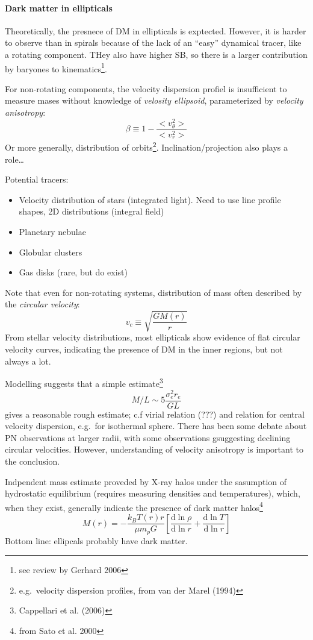 \documentclass{article}
\newcommand{\mynotes}[1]{\textcolor{cadmiumgreen}{#1}}
\begin{document}
\paragraph{Dark matter in ellipticals}
Theoretically, the presnece of DM in ellipticals is exptected. However, it
is harder to observe than in spirals because of the lack of an ``easy''
dynamical tracer, like a rotating component. THey also have higher SB,
so there is a larger contribution by baryones to kinematics\footnote{see
review by Gerhard 2006}.

For non-rotating components, the velocity dispersion profiel is insufficient
to measure mases without knowledge of \textit{velosity ellipsoid},
parameterized by \textit{velocity anisotropy}:
\[
    \beta \equiv 1 - \frac{<v_{\theta}^{2}>}{<v_{r}^{2}>}
    \]
Or more generally, distribution of orbits\footnote{e.g.\ velocity dispersion
profiles, from van der Marel (1994)}. Inclination/projection also plays a
role\ldots

Potential tracers:
\begin{itemize}
    \item Velocity distribution of stars (integrated light). Need to use
        line profile shapes, 2D distributions (integral field)
    \item Planetary nebulae
    \item Globular clusters
    \item Gas disks (rare, but do exist)
\end{itemize}
Note that even for non-rotating systems, distribution of mass often described
by the \textit{circular velocity}:
\[
    v_{c} \equiv \sqrt{\frac{GM(r)}{r}}
    \]
From stellar velocity distributions, most ellipticals show evidence of
flat circular velocity curves, indicating the presence of DM in the inner
regions, but not always a lot.

Modelling suggests that a simple estimate\footnote{Cappellari et al. (2006)}
\[
    M/L \sim 5\frac{\sigma_{e}^{2}r_{e}}{GL}
    \]
gives a reasonable rough estimate; c.f virial relation \mynotes{(???)}
and relation for
central velocity dispersion, e.g.\ for isothermal sphere.
There has been some debate about PN observations at larger radii, with some
observations gsuggesting declining circular velocities. However, understanding
of velocity anisotropy is important to the conclusion.

Indpendent mass estimate proveded by X-ray halos under the sasumption of
hydrostatic equilibrium (requires measuring densities and temperatures),
which, when they exist, generally indicate the presence of dark matter
halos\footnote{from Sato et al. 2000}
\[
    M(r) = -\frac{k_{B}T(r)r}{{\mu}m_{p}G}
    \left[\frac{\mathrm{d}\ln{\rho}}{\mathrm{d}\ln{r}} +
    \frac{\mathrm{d}\ln{T}}{\mathrm{d}\ln{r}}\right]
    \]
Bottom line: ellipcals probably have dark matter.
\end{document}
